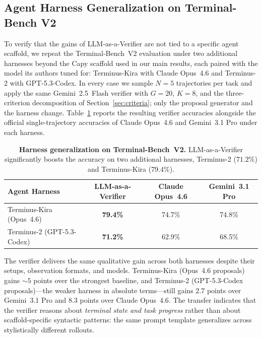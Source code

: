 \subsection{Agent Harness Generalization on Terminal-Bench V2}
\label{app:harness}

To verify that the gains of LLM-as-a-Verifier are not tied to a specific agent scaffold, we repeat the Terminal-Bench~V2 evaluation under two additional harnesses beyond the Capy scaffold used in our main results, each paired with the model its authors tuned for: Terminus-Kira with Claude Opus~4.6 and Terminus-2 with GPT-5.3-Codex. In every case we sample $N{=}5$ trajectories per task and apply the same Gemini~2.5~Flash verifier with $G{=}20$, $K{=}8$, and the three-criterion decomposition of Section~\ref{sec:criteria}; only the proposal generator and the harness change. Table~\ref{tab:harness-generalization} reports the resulting verifier accuracies alongside the official single-trajectory accuracies of Claude Opus~4.6 and Gemini~3.1 Pro under each harness.

\begin{table}[h]
\centering
\caption{\textbf{Harness generalization on Terminal-Bench~V2.} LLM-as-a-Verifier significantly boosts the accuracy on two additional harnesses, Terminus-2 ($71.2\%$) and Terminus-Kira ($79.4\%$).}
\label{tab:harness-generalization}
\small
\setlength{\tabcolsep}{6pt}
\begin{tabular}{lccc}
\toprule
Agent Harness & \textbf{LLM-as-a-Verifier} & Claude Opus~4.6 & Gemini~3.1 Pro \\
\midrule
Terminus-Kira (Opus~4.6)    & \textbf{79.4\%} & 74.7\% & 74.8\% \\
Terminus-2 (GPT-5.3-Codex)  & \textbf{71.2\%} & 62.9\% & 68.5\% \\
\bottomrule
\end{tabular}
\end{table}

The verifier delivers the same qualitative gain across both harnesses despite their setups, observation formats, and models. Terminus-Kira (Opus~4.6 proposals) gains $\sim\!5$ points over the strongest baseline, and Terminus-2 (GPT-5.3-Codex proposals)---the weaker harness in absolute terms---still gains $2.7$ points over Gemini~3.1 Pro and $8.3$ points over Claude Opus~4.6. The transfer indicates that the verifier reasons about \emph{terminal state and task progress} rather than about scaffold-specific syntactic patterns: the same prompt template generalizes across stylistically different rollouts.

